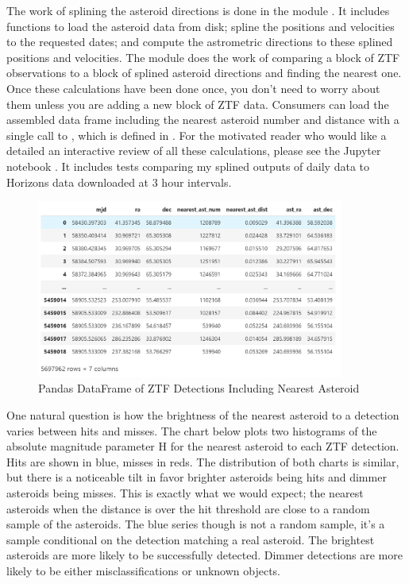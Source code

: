 The work of splining the asteroid directions is done in the module .
It includes functions to load the asteroid data from disk; spline the positions and velocities to the requested dates;
and compute the astrometric directions to these splined positions and velocities.
The module  does the work of comparing a block of ZTF observations to a block of splined asteroid directions and finding the nearest one.
Once these calculations have been done once, you don't need to worry about them unless you are adding a new block of ZTF data.
Consumers can load the assembled data frame including the nearest asteroid number and distance with 
a single call to , which is defined in .
For the motivated reader who would like a detailed an interactive review of all these calculations, please see the Jupyter notebook .
It includes tests comparing my splined outputs of daily data to Horizons data downloaded at 3 hour intervals.

\begin{figure}[hbt!]
\begin{center}
\includegraphics[width=0.9\textwidth]{../figs/ztf/ztf_nearest_ast_dataframe.png}
\caption[Pandas DataFrame of ZTF Detections Including Nearest Asteroid]
{Pandas DataFrame of ZTF Detections Including Nearest Asteroid}
\end{center}
\end{figure}

One natural question is how the brightness of the nearest asteroid to a detection varies between hits and misses.
The chart below plots two histograms of the absolute magnitude parameter H for the nearest asteroid to each ZTF detection.
Hits are shown in blue, misses in reds.
The distribution of both charts is similar, but there is a noticeable tilt 
in favor brighter asteroids being hits and dimmer asteroids being misses.
This is exactly what we would expect; 
the nearest asteroids when the distance is over the hit threshold are close to a random sample of the asteroids.
The blue series though is not a random sample, it's a sample conditional on the detection matching a real asteroid.
The brightest asteroids are more likely to be successfully detected.
Dimmer detections are more likely to be either misclassifications or unknown objects.

